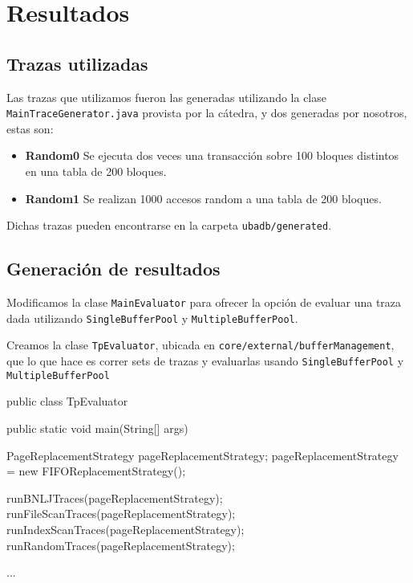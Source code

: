 \section{Resultados}


\vspace*{0.3cm}

\subsection{Trazas utilizadas}

Las trazas que utilizamos fueron las generadas utilizando la
clase \texttt{MainTraceGenerator.java} provista por la cátedra,
y dos generadas por nosotros, estas son:

\begin{itemize}
    \item
            \textbf{Random0}
            Se ejecuta dos veces una transacci\'on sobre 100 bloques
            distintos en una tabla de 200 bloques.
            
    \item
            \textbf{Random1}
            Se realizan 1000 accesos random a una tabla de 200 bloques.

\end{itemize}

Dichas trazas pueden encontrarse en la carpeta 
\texttt{ubadb/generated}.


\subsection{Generación de resultados}

Modificamos la clase \texttt{MainEvaluator} para ofrecer la opción de
evaluar una traza dada utilizando \texttt{SingleBufferPool}
y \texttt{MultipleBufferPool}. 

\vspace*{0.5cm}

Creamos la clase \texttt{TpEvaluator}, ubicada en
\texttt{core/external/bufferManagement}, que lo que hace es
correr sets de trazas y evaluarlas usando \texttt{SingleBufferPool}
y \texttt{MultipleBufferPool}

\begin{verbatimtab}[4]
public class TpEvaluator 
{
	public static void main(String[] args)
	{
		PageReplacementStrategy pageReplacementStrategy;
		pageReplacementStrategy = new FIFOReplacementStrategy();
	
		runBNLJTraces(pageReplacementStrategy);
		runFileScanTraces(pageReplacementStrategy);
		runIndexScanTraces(pageReplacementStrategy);		
		runRandomTraces(pageReplacementStrategy);
	}

	...
}
\end{verbatimtab}

